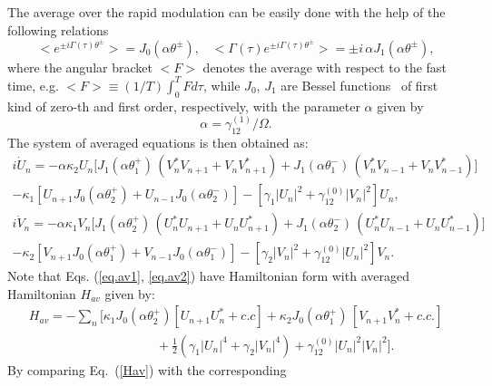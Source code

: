\documentclass[12pt]{iopart}
\begin{document}
The average over the rapid modulation can be easily done with the help of the following relations
\begin{equation}
<e^{\pm i\Gamma(\tau)\theta^{\pm}}>  =J_{0}(\alpha\theta^{\pm}), \;\;\;
<\Gamma(\tau)e^{\pm i\Gamma(\tau)\theta^{\pm}}>=\pm i\,\alpha J_{1}(\alpha\theta^{\pm}),
\label{averages}
\end{equation}
where the angular bracket $<F>$ denotes the average with respect
to the fast time, e.g. $<F>\equiv(1/T)\int_{0}^{T}Fd\tau$, while
$J_{0}$, $J_{1}$ are Bessel functions~\cite{abramowitz} of first
kind of zero-th and first order, respectively, with the parameter $\alpha$
given by
\begin{equation}
\alpha=\gamma_{12}^{(1)}/\Omega.\label{alfa}
\end{equation}
The system of averaged equations is then obtained as:
\begin{eqnarray}
i\dot{U}_{n}=-  \alpha\kappa_{2}U_{n}\Big[J_{1}(\alpha\theta_{1}^{+})\,\left(V_{n}^{\ast}V_{n+1}+V_{n}V_{n+1}^{\ast}\right)
  +J_{1}(\alpha\theta_{1}^{-})\,\left(V_{n}^{\ast}V_{n-1}+V_{n}V_{n-1}^{\ast}\right)\Big]\nonumber\\
-  \kappa_{1}\left[U_{n+1}J_{0}(\alpha\theta_{2}^{+})+U_{n-1}J_{0}(\alpha\theta_{2}^{-})\right]
-  \left[\gamma_{1}|U_{n}|^{2}+\gamma_{12}^{(0)}|V_{n}|^{2}\right]U_{n},
\label{eq.av1}
\end{eqnarray}
\begin{eqnarray}
i\dot{V}_{n}=-  \alpha\kappa_{1}V_{n}\Big[J_{1}(\alpha\theta_{2}^{+})\,\left(U_{n}^{\ast}U_{n+1}+U_{n}U_{n+1}^{\ast}\right)
  +J_{1}(\alpha\theta_{2}^{-})\,\left(U_{n}^{\ast}U_{n-1}+U_{n}U_{n-1}^{\ast}\right)\Big]\nonumber\\
-  \kappa_{2}\left[V_{n+1}J_{0}(\alpha\theta_{1}^{+})+V_{n-1}J_{0}(\alpha\theta_{1}^{-})\right]
-  \left[\gamma_{2}|V_{n}|^{2}+\gamma_{12}^{(0)}|U_{n}|^{2}\right]V_{n}.
\label{eq.av2}
\end{eqnarray}
Note that Eqs. (\ref{eq.av1}, \ref{eq.av2}) have Hamiltonian form
with averaged Hamiltonian $H_{av}$ given by:
\begin{eqnarray}
H_{av}=- \sum_{n}\Big[\kappa_{1}J_{0}(\alpha\theta_{2}^{+})[U_{n+1}U_{n}^{\ast}+ c.c] + \kappa_{2}J_{0}(\alpha\theta_{1}^{+})\,[V_{n+1}V_{n}^{\ast}+c.c.] \nonumber\\ \qquad\qquad\qquad\qquad\qquad
 + \frac{1}{2}\left(\gamma_{1}|U_{n}|^{4}+\gamma_{2}|V_{n}|^{4}\right)+\gamma_{12}^{(0)}|U_{n}|^{2}|V_{n}|^{2}\Big].\label{Hav}
\end{eqnarray}
By comparing Eq.~(\ref{Hav}) with the corresponding
\end{document}
